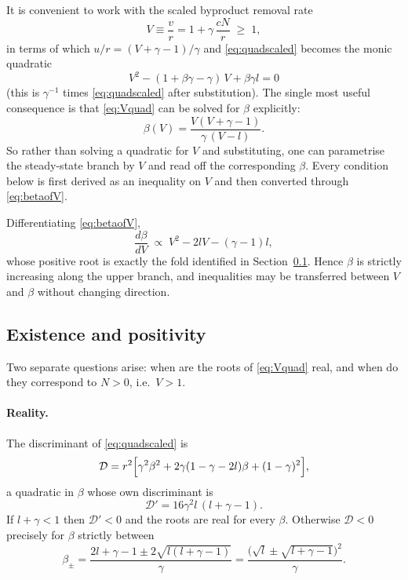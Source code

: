 \documentclass[11pt,a4paper]{article}
\theoremstyle{plain}
\theoremstyle{remark}
\begin{document}
It is convenient to work with the scaled byproduct removal rate
\begin{equation}
V \equiv \frac{v}{r} = 1 + \gamma\,\frac{cN}{r} \;\ge\; 1 ,
\label{eq:Vdef}
\end{equation}
in terms of which $u/r = (V+\gamma-1)/\gamma$ and \eqref{eq:quadscaled} becomes
the monic quadratic
\begin{equation}
\boxed{\;V^2 - (1+\beta\gamma-\gamma)\,V + \beta\gamma l = 0\;}
\label{eq:Vquad}
\end{equation}
(this is $\gamma^{-1}$ times \eqref{eq:quadscaled} after substitution). The
single most useful consequence is that \eqref{eq:Vquad} can be solved for
$\beta$ explicitly:
\begin{equation}
\beta(V) = \frac{V(V+\gamma-1)}{\gamma\,(V-l)} .
\label{eq:betaofV}
\end{equation}
So rather than solving a quadratic for $V$ and substituting, one can parametrise
the steady-state branch by $V$ and read off the corresponding $\beta$. Every
condition below is first derived as an inequality on $V$ and then converted
through \eqref{eq:betaofV}.

Differentiating \eqref{eq:betaofV},
\begin{equation}
\frac{d\beta}{dV} \;\propto\; V^2 - 2lV - (\gamma-1)l ,
\label{eq:dbetadV}
\end{equation}
whose positive root is exactly the fold identified in
Section~\ref{sec:existence}. Hence $\beta$ is strictly increasing along the
upper branch, and inequalities may be transferred between $V$ and $\beta$
without changing direction.

\subsection{Existence and positivity}
\label{sec:existence}

Two separate questions arise: when are the roots of \eqref{eq:Vquad} real, and
when do they correspond to $N>0$, i.e.\ $V>1$.

\paragraph{Reality.} The discriminant of \eqref{eq:quadscaled} is
\begin{equation}
\mathcal{D} = r^2\Bigl[\gamma^2\beta^2 + 2\gamma(1-\gamma-2l)\beta + (1-\gamma)^2\Bigr],
\end{equation}
a quadratic in $\beta$ whose own discriminant is
\begin{equation}
\mathcal{D}' = 16\gamma^2 l\,(l+\gamma-1).
\end{equation}
If $l+\gamma<1$ then $\mathcal{D}'<0$ and the roots are real for every $\beta$.
Otherwise $\mathcal{D}<0$ precisely for $\beta$ strictly between
\begin{equation}
\beta_\pm = \frac{2l+\gamma-1 \pm 2\sqrt{l(l+\gamma-1)}}{\gamma}
= \frac{\bigl(\sqrt{l}\pm\sqrt{l+\gamma-1}\bigr)^{2}}{\gamma}.
\label{eq:betapm}
\end{equation}
\end{document}
